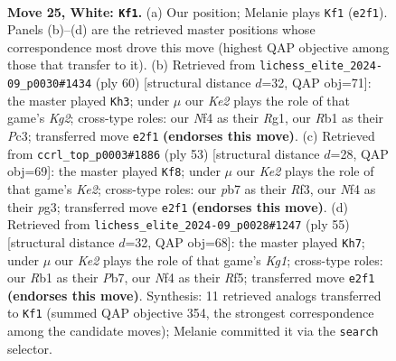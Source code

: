 \documentclass[11pt]{article}
\begin{document}
\clearpage

\begin{figure}[p]\centering
\begin{subfigure}{0.46\textwidth}\centering
\resizebox{\linewidth}{!}{%
\newchessgame
\chessboard[
  setfen={2kr4/ppp4R/8/5p2/4pN2/8/PPr1KP1P/1R6 w - - 2 25},
  showmover=false,
  pgfstyle=straightmove, color=movearrow, markmove={e2-f1}
]}
\caption{}
\end{subfigure}\hfill
\begin{subfigure}{0.46\textwidth}\centering
\resizebox{\linewidth}{!}{%
\newchessgame
\chessboard[
  setfen={5rk1/7p/R2pp1p1/NPp5/8/2P3P1/4r1KP/6R1 w - - 1 31},
  showmover=false,
  pgfstyle=straightmove, color=movearrow, markmove={g2-h3}
]}
\caption{}
\end{subfigure}
\\[4pt]
\begin{subfigure}{0.46\textwidth}\centering
\resizebox{\linewidth}{!}{%
\newchessgame
\chessboard[
  setfen={r7/ppR1kppp/8/8/P2R4/5rP1/1P5P/K7 b - - 1 27},
  showmover=false,
  pgfstyle=straightmove, color=movearrow, markmove={e7-f8}
]}
\caption{}
\end{subfigure}\hfill
\begin{subfigure}{0.46\textwidth}\centering
\resizebox{\linewidth}{!}{%
\newchessgame
\chessboard[
  setfen={4R1k1/1p4p1/7p/2pp1r2/5Pn1/6P1/PP5P/R5K1 b - - 0 28},
  showmover=false,
  pgfstyle=straightmove, color=movearrow, markmove={g8-h7}
]}
\caption{}
\end{subfigure}
\caption{\textbf{Move 25, White: \texttt{Kf1}.} (a) Our position; Melanie plays \texttt{Kf1} (\texttt{e2f1}). Panels (b)--(d) are the retrieved master positions whose correspondence most drove this move (highest QAP objective among those that transfer to it). (b) Retrieved from \texttt{lichess\_elite\_2024-09\_p0030\#1434} (ply 60) [structural distance $d$=32, QAP obj=71]: the master played \texttt{Kh3}; under $\mu$ our \emph{Ke2} plays the role of that game's \emph{Kg2}; cross-type roles: our \emph{N}f4 as their \emph{R}g1, our \emph{R}b1 as their \emph{P}c3; transferred move \texttt{e2f1} \textbf{(endorses this move)}. (c) Retrieved from \texttt{ccrl\_top\_p0003\#1886} (ply 53) [structural distance $d$=28, QAP obj=69]: the master played \texttt{Kf8}; under $\mu$ our \emph{Ke2} plays the role of that game's \emph{Ke2}; cross-type roles: our \emph{p}b7 as their \emph{R}f3, our \emph{N}f4 as their \emph{p}g3; transferred move \texttt{e2f1} \textbf{(endorses this move)}. (d) Retrieved from \texttt{lichess\_elite\_2024-09\_p0028\#1247} (ply 55) [structural distance $d$=32, QAP obj=68]: the master played \texttt{Kh7}; under $\mu$ our \emph{Ke2} plays the role of that game's \emph{Kg1}; cross-type roles: our \emph{R}b1 as their \emph{P}b7, our \emph{N}f4 as their \emph{R}f5; transferred move \texttt{e2f1} \textbf{(endorses this move)}. Synthesis: 11 retrieved analogs transferred to \texttt{Kf1} (summed QAP objective 354, the strongest correspondence among the candidate moves); Melanie committed it via the \texttt{search} selector.}
\label{fig:thought-m48}
\end{figure}
\end{document}
